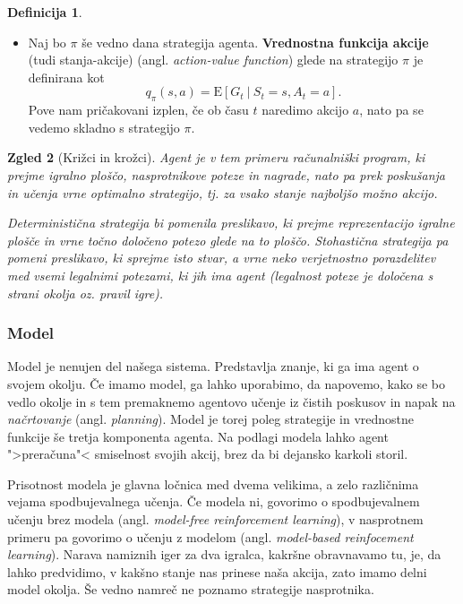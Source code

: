\documentclass[12pt,a4paper]{amsart}
\theoremstyle{definition} %
\newtheorem{definicija}{Definicija}[section]
\theoremstyle{plain} %
\newtheorem{zgled}[definicija]{Zgled}
\begin{document}
\begin{definicija}
\begin{itemize}
        \item Naj bo $\pi$ še vedno dana strategija agenta. \textbf{Vrednostna funkcija 
                akcije} (tudi stanja-akcije) (angl. \textit{action-value function}) glede na 
                strategijo $\pi$ je definirana kot
                \begin{equation}\label{vfa}
                q_\pi(s, a) = \mathrm{E} [G_t~|~S_t = s, A_t = a].  
                \end{equation}
                Pove nam pričakovani izplen, če ob času $t$ naredimo akcijo $a$, nato pa se 
                vedemo skladno s strategijo $\pi$.
    \end{itemize}
\end{definicija}

\begin{zgled}[Križci in krožci]
    Agent je v tem primeru računalniški program, ki prejme igralno ploščo, nasprotnikove 
    poteze in nagrade, nato pa prek poskušanja in učenja vrne optimalno strategijo, tj. 
    za vsako stanje najboljšo možno akcijo.

    Deterministična strategija bi pomenila preslikavo, ki prejme reprezentacijo igralne plošče
    in vrne točno določeno potezo glede na to ploščo. Stohastična strategija pa pomeni preslikavo, 
    ki sprejme isto stvar, a vrne neko verjetnostno porazdelitev med vsemi legalnimi potezami, 
    ki jih ima agent (legalnost poteze je določena s strani okolja oz. pravil igre).
\end{zgled}

\subsubsection{Model}
Model je nenujen del našega sistema. Predstavlja znanje, ki ga ima agent o svojem okolju. 
Če imamo model, ga lahko uporabimo, da napovemo, kako se bo vedlo okolje in s tem premaknemo
agentovo učenje iz čistih poskusov in napak na \textit{načrtovanje} (angl. \textit{planning}).
Model je torej poleg strategije in vrednostne funkcije še tretja komponenta agenta. Na podlagi 
modela lahko agent ">preračuna"< smiselnost svojih akcij, brez da bi dejansko karkoli storil. 

Prisotnost modela je glavna ločnica med dvema velikima, a zelo različnima vejama spodbujevalnega
učenja. Če modela ni, govorimo o spodbujevalnem učenju brez modela (angl. \textit{model-free 
reinforcement learning}), v nasprotnem primeru pa govorimo o učenju z modelom (angl. \textit
{model-based reinfocement learning}). Narava namiznih iger za dva igralca, kakršne obravnavamo tu,
je, da lahko predvidimo, v kakšno stanje nas prinese naša akcija, zato imamo delni model okolja. 
Še vedno namreč ne poznamo strategije nasprotnika.
\end{document}
